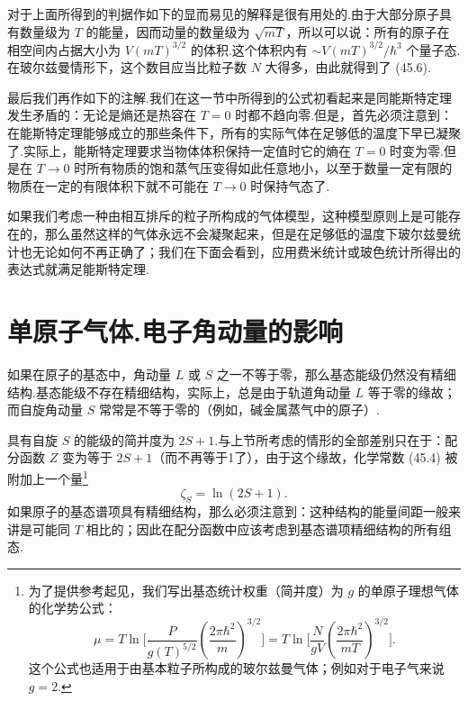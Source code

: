 对于上面所得到的判据作如下的显而易见的解释是很有用处的.由于大部分原子具有数量级为 $T$ 的能量，因而动量的数量级为 $\sqrt{mT}$，所以可以说：所有的原子在相空间内占据大小为 $V(mT)^{3/2}$ 的体积.这个体积内有 $\sim V(mT)^{3/2}/\hbar^3$ 个量子态.在玻尔兹曼情形下，这个数目应当比粒子数 $N$ 大得多，由此就得到了 (45.6).

最后我们再作如下的注解.我们在这一节中所得到的公式初看起来是同能斯特定理发生矛盾的：无论是熵还是热容在 $T=0$ 时都不趋向零.但是，首先必须注意到：在能斯特定理能够成立的那些条件下，所有的实际气体在足够低的温度下早已凝聚了.实际上，能斯特定理要求当物体体积保持一定值时它的熵在 $T=0$ 时变为零.但是在 $T\to0$ 时所有物质的饱和蒸气压变得如此任意地小，以至于数量一定有限的物质在一定的有限体积下就不可能在 $T\to0$ 时保持气态了.

如果我们考虑一种由相互排斥的粒子所构成的气体模型，这种模型原则上是可能存在的，那么虽然这样的气体永远不会凝聚起来，但是在足够低的温度下玻尔兹曼统计也无论如何不再正确了；我们在下面会看到，应用费米统计或玻色统计所得出的表达式就满足能斯特定理.

\section{单原子气体.电子角动量的影响}

如果在原子的基态中，角动量 $L$ 或 $S$ 之一不等于零，那么基态能级仍然没有精细结构.基态能级不存在精细结构，实际上，总是由于轨道角动量 $L$ 等于零的缘故；而自旋角动量 $S$ 常常是不等于零的（例如，碱金属蒸气中的原子）.

具有自旋 $S$ 的能级的简并度为 $2S+1$.与上节所考虑的情形的全部差别只在于：配分函数 $Z$ 变为等于 $2S+1$（而不再等于1了），由于这个缘故，化学常数 (45.4) 被附加上一个量\footnote{为了提供参考起见，我们写出基态统计权重（简并度）为 $g$ 的单原子理想气体的化学势公式：
\begin{equation}
  \mu=T\ln\Bigg[\frac{P}{g(T)^{5/2}}\left(\frac{2\pi\hbar^2}{m}\right)^{3/2}\Bigg]
  =T\ln\Bigg[\frac{N}{gV}\left(\frac{2\pi\hbar^2}{mT}\right)^{3/2}\Bigg].\tag{46.1a}
\end{equation}
这个公式也适用于由基本粒子所构成的玻尔兹曼气体；例如对于电子气来说 $g=2$.}
\begin{equation}
  \zeta_S=\ln\left(2S+1\right).
\end{equation}
如果原子的基态谱项具有精细结构，那么必须注意到：这种结构的能量间距一般来讲是可能同 $T$ 相比的；因此在配分函数中应该考虑到基态谱项精细结构的所有组态.

